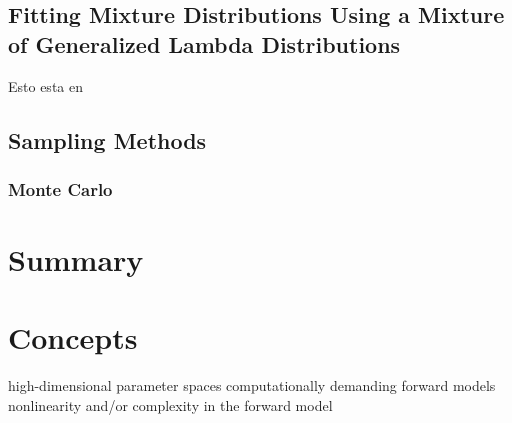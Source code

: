 \subsection{Fitting Mixture Distributions Using a Mixture of Generalized Lambda Distributions}
Esto esta en \cite{Tobergte2013}

\subsection{Sampling Methods}

\subsubsection{Monte Carlo}

\section{Summary}

\section{Concepts}
high-dimensional parameter spaces %
computationally demanding forward models 
nonlinearity and/or complexity in the forward model


%
